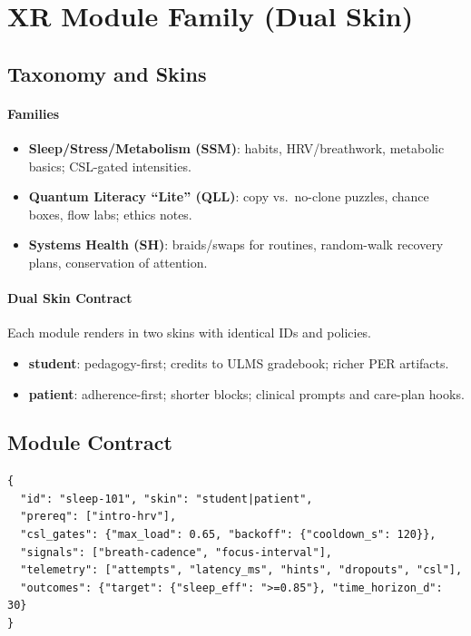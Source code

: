 \documentclass[11pt]{article}
\theoremstyle{plain}
\begin{document}
\section{XR Module Family (Dual Skin)}

\subsection{Taxonomy and Skins}
\paragraph{Families}
\begin{itemize}
  \item \textbf{Sleep/Stress/Metabolism (SSM)}: habits, HRV/breathwork, metabolic basics; CSL-gated intensities.
  \item \textbf{Quantum Literacy ``Lite'' (QLL)}: copy vs.\ no-clone puzzles, chance boxes, flow labs; ethics notes.
  \item \textbf{Systems Health (SH)}: braids/swaps for routines, random-walk recovery plans, conservation of attention.
\end{itemize}

\paragraph{Dual Skin Contract}
Each module renders in two skins with identical IDs and policies.
\begin{itemize}
  \item \textbf{student}: pedagogy-first; credits to ULMS gradebook; richer PER artifacts.
  \item \textbf{patient}: adherence-first; shorter blocks; clinical prompts and care-plan hooks.
\end{itemize}

\subsection{Module Contract}
\begin{verbatim}
{
  "id": "sleep-101", "skin": "student|patient",
  "prereq": ["intro-hrv"],
  "csl_gates": {"max_load": 0.65, "backoff": {"cooldown_s": 120}},
  "signals": ["breath-cadence", "focus-interval"],
  "telemetry": ["attempts", "latency_ms", "hints", "dropouts", "csl"],
  "outcomes": {"target": {"sleep_eff": ">=0.85"}, "time_horizon_d": 30}
}
\end{verbatim}
\end{document}
